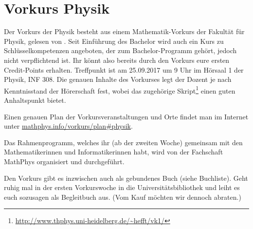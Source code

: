 \section{Vorkurs Physik}
Der Vorkurs der Physik besteht aus einem Mathematik-Vorkurs der Fakultät für Physik, gelesen von \dozentvorkurs. Seit Einführung des Bachelor wird auch ein Kurs zu Schlüsselkompetenzen angeboten, der zum Bachelor-Programm gehört, jedoch nicht verpflichtend ist. Ihr könnt also bereits durch den Vorkurs eure ersten Credit-Points erhalten. Treffpunkt ist am 25.09.2017 um 9 Uhr im Hörsaal 1 der \Gls{Physik}, \Gls{INF} 308. Die genauen Inhalte des Vorkurses legt der Dozent je nach Kenntnisstand der Hörerschaft fest, wobei das zugehörige Skript\footnote{\url{http://www.thphys.uni-heidelberg.de/~hefft/vk1/}} einen guten Anhaltspunkt bietet.

Einen genauen Plan der Vorkursveranstaltungen und Orte findet man im Internet  unter \url{mathphys.info/vorkurs/plan\#physik}.

Das Rahmenprogramm, welches ihr (ab der zweiten Woche) gemeinsam mit den Mathematikerinnen und Informatikerinnen habt, wird von der Fachschaft MathPhys organisiert und durchgeführt.

Den Vorkurs gibt es inzwischen auch als gebundenes Buch (siehe Buchliste).
Geht ruhig mal in der ersten Vorkurswoche in die Universitätsbibliothek und leiht es euch sozusagen als Begleitbuch aus.
(Vom Kauf möchten wir dennoch abraten.)
